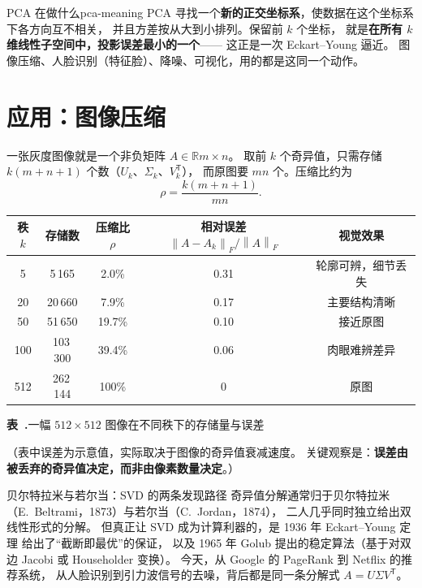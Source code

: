 \documentclass[11pt,a4paper,openany]{ctexbook}
\newcommand{\R}{\mathbb{R}}
\newcommand{\norm}[1]{\left\lVert #1 \right\rVert}
\newcounter{tabnum}[chapter]
\newenvironment{latab}[1]{%
  \par\addvspace{9pt}%
  \stepcounter{tabnum}%
  \gdef\latabcap{#1}%
  \begin{center}%
  \begin{minipage}{0.94\textwidth}%
}{%
  \end{minipage}%
  \par\vspace{4pt}%
  {\small\sffamily\color{qing}\textbf{表~\thechapter.\arabic{tabnum}}\quad \latabcap\par}%
  \vspace{3pt}%
  \end{center}%
  \addvspace{8pt}%
}
\begin{document}
\begin{remk}{PCA 在做什么}{pca-meaning}
PCA 寻找一个\textbf{新的正交坐标系}，使数据在这个坐标系下各方向互不相关，
并且方差按从大到小排列。保留前 $k$ 个坐标，
就是\textbf{在所有 $k$ 维线性子空间中，投影误差最小的一个}——
这正是一次 Eckart--Young 逼近。
图像压缩、人脸识别（特征脸）、降噪、可视化，用的都是这同一个动作。
\end{remk}

\section{应用：图像压缩}

一张灰度图像就是一个非负矩阵 $A\in\R{m\times n}$。
取前 $k$ 个奇异值，只需存储
$k(m+n+1)$ 个数（$U_k$、$\Sigma_k$、$V_k^{\mathsf T}$），
而原图要 $mn$ 个。压缩比约为
\[
\rho=\frac{k(m+n+1)}{mn}.
\]

\begin{latab}{一幅 $512\times 512$ 图像在不同秩下的存储量与误差}
\small\centering
\renewcommand{\arraystretch}{1.4}
\begin{tabular}{@{}ccccc@{}}
\toprule
\sffamily 秩 $k$ & \sffamily 存储数 & \sffamily 压缩比 $\rho$ &
\sffamily 相对误差 $\norm{A-A_k}_F/\norm{A}_F$ & \sffamily 视觉效果\\
\midrule
5    & 5\,165   & 2.0\%  & 0.31 & 轮廓可辨，细节丢失\\
20   & 20\,660  & 7.9\%  & 0.17 & 主要结构清晰\\
50   & 51\,650  & 19.7\% & 0.10 & 接近原图\\
100  & 103\,300 & 39.4\% & 0.06 & 肉眼难辨差异\\
512  & 262\,144 & 100\%  & 0    & 原图\\
\bottomrule
\end{tabular}
\end{latab}

（表中误差为示意值，实际取决于图像的奇异值衰减速度。
关键观察是：\textbf{误差由被丢弃的奇异值决定，而非由像素数量决定}。）

\begin{sidebar}{贝尔特拉米与若尔当：SVD 的两条发现路径}
奇异值分解通常归于贝尔特拉米（E.\ Beltrami，1873）与若尔当（C.\ Jordan，1874），
二人几乎同时独立给出双线性形式的分解。
但真正让 SVD 成为计算利器的，是 1936 年 Eckart--Young 定理
给出了“截断即最优”的保证，
以及 1965 年 Golub 提出的稳定算法（基于对双边 Jacobi 或 Householder 变换）。
今天，从 Google 的 PageRank 到 Netflix 的推荐系统，
从人脸识别到引力波信号的去噪，背后都是同一条分解式
$A=U\Sigma V^{\mathsf T}$。
\end{sidebar}
\end{document}

